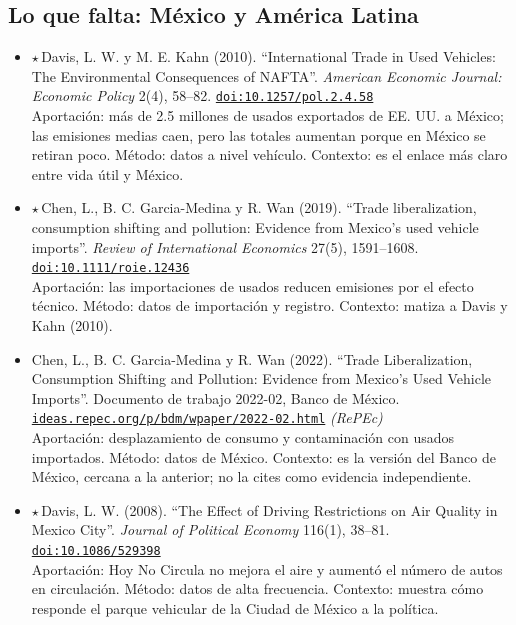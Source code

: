 \documentclass[11pt]{article}
\begin{document}
\subsection*{Lo que falta: México y América Latina}
\begin{itemize}
\item $\star$\,Davis, L. W. y M. E. Kahn (2010). ``International Trade in Used Vehicles: The Environmental Consequences of NAFTA''. \textit{American Economic Journal: Economic Policy} 2(4), 58--82. \href{https://doi.org/10.1257/pol.2.4.58}{\texttt{doi:10.1257/pol.2.4.58}}\\
Aportación: más de 2.5 millones de usados exportados de EE. UU. a México; las emisiones medias caen, pero las totales aumentan porque en México se retiran poco. Método: datos a nivel vehículo. Contexto: es el enlace más claro entre vida útil y México.
\item $\star$\,Chen, L., B. C. Garcia-Medina y R. Wan (2019). ``Trade liberalization, consumption shifting and pollution: Evidence from Mexico's used vehicle imports''. \textit{Review of International Economics} 27(5), 1591--1608. \href{https://doi.org/10.1111/roie.12436}{\texttt{doi:10.1111/roie.12436}}\\
Aportación: las importaciones de usados reducen emisiones por el efecto técnico. Método: datos de importación y registro. Contexto: matiza a Davis y Kahn (2010).
\item Chen, L., B. C. Garcia-Medina y R. Wan (2022). ``Trade Liberalization, Consumption Shifting and Pollution: Evidence from Mexico's Used Vehicle Imports''. Documento de trabajo 2022-02, Banco de México. \href{https://ideas.repec.org/p/bdm/wpaper/2022-02.html}{\texttt{ideas.repec.org/p/bdm/wpaper/2022-02.html}} \textit{(RePEc)}\\
Aportación: desplazamiento de consumo y contaminación con usados importados. Método: datos de México. Contexto: es la versión del Banco de México, cercana a la anterior; no la cites como evidencia independiente.
\item $\star$\,Davis, L. W. (2008). ``The Effect of Driving Restrictions on Air Quality in Mexico City''. \textit{Journal of Political Economy} 116(1), 38--81. \href{https://doi.org/10.1086/529398}{\texttt{doi:10.1086/529398}}\\
Aportación: Hoy No Circula no mejora el aire y aumentó el número de autos en circulación. Método: datos de alta frecuencia. Contexto: muestra cómo responde el parque vehicular de la Ciudad de México a la política.

\end{itemize}
\end{document}
